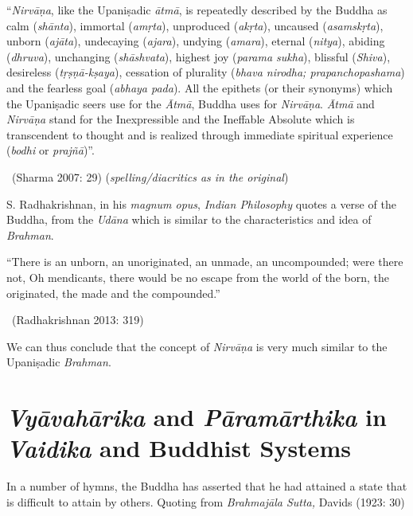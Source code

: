 \begin{myquote}
“\textit{Nirvāṇa}, like the Upaniṣadic \textit{ātmā}, is repeatedly described by the Buddha as calm (\textit{shānta}), immortal (\textit{amṛta}), unproduced (\textit{akṛta}), uncaused (\textit{asamskṛta}), unborn (\textit{ajāta}), undecaying (\textit{ajara}), undying (\textit{amara}), eternal (\textit{nitya}), abiding (\textit{dhruva}), unchanging (\textit{shāshvata}), highest joy (\textit{parama sukha}), blissful (\textit{Shiva}), desireless (\textit{tṛṣṇā-kṣaya}), cessation of plurality (\textit{bhava nirodha; prapanchopashama}) and the fearless goal (\textit{abhaya pada}). All the epithets (or their synonyms) which the Upaniṣadic seers use for the \textit{Ātmā}, Buddha uses for \textit{Nirvāṇa}. \textit{Ātmā} and \textit{Nirvāṇa} stand for the Inexpressible and the Ineffable Absolute which is transcendent to thought and is realized through immediate spiritual experience (\textit{bodhi} or \textit{prajñā})”. 

~\hfill (Sharma 2007: 29) (\textit{spelling/diacritics as in the original})
\end{myquote}

S. Radhakrishnan, in his \textit{magnum opus}, \textit{Indian Philosophy} quotes a verse of the Buddha, from the \textit{Udāna} which is similar to the characteristics and idea of \textit{Brahman}.

\begin{myquote}
“There is an unborn, an unoriginated, an unmade, an uncompounded; were there not, Oh mendicants, there would be no escape from the world of the born, the originated, the made and the compounded.” 

~\hfill (Radhakrishnan 2013: 319)
\end{myquote}

We can thus conclude that the concept of \textit{Nirvāṇa} is very much similar to the Upaniṣadic \textit{Brahman}.

\vspace{-.3cm}

\section*{\textit{Vyāvahārika} and \textit{Pāramārthika} \hfill\break in \textit{Vaidika} and Buddhist Systems}

In a number of hymns, the Buddha has asserted that he had attained a state that is difficult to attain by others. Quoting from \textit{Brahmajāla Sutta,} Davids (1923: 30)

